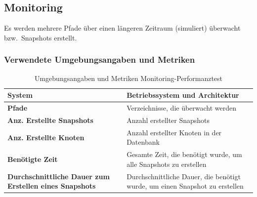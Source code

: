\documentclass[a4paper,12pt]{report}
\begin{document}
    \clearpage

    \subsection{Monitoring}\label{subsec:monitoring)}
    Es werden mehrere Pfade über einen längeren Zeitraum (simuliert) überwacht bzw.\ Snapshots erstellt.

    \subsubsection{Verwendete Umgebungsangaben und Metriken}\label{subsubsec:monitoring-perftest-metrics-title}
    \begin{table}[h!]
        \centering
        \setlength{\leftmargini}{0.8cm}
        \begin{tabular}{|p{7cm}|p{7cm}|}
            \hline
            \textbf{System}                                                & Betriebssystem und Architektur                                              \\ \hline
            \textbf{Pfade}                                                 & Verzeichnisse, die überwacht werden                                         \\ \hline
            \textbf{Anz. Erstellte Snapshots}                              & Anzahl erstellter Snapshots                                                 \\ \hline
            \textbf{Anz. Erstellte Knoten}                                 & Anzahl erstellter Knoten in der Datenbank                                   \\ \hline
            \textbf{Benötigte Zeit}                                        & Gesamte Zeit, die benötigt wurde, um alle Snapshots zu erstellen            \\ \hline
            \textbf{Durchschnittliche Dauer zum Erstellen eines Snapshots} & Durchschnittliche Dauer, die benötigt wurde, um einen Snapshot zu erstellen \\ \hline
        \end{tabular}
        \caption{Umgebungsangaben und Metriken Monitoring-Performanztest}\label{tab:monitoring-perftest-metrics}
    \end{table}
\end{document}
